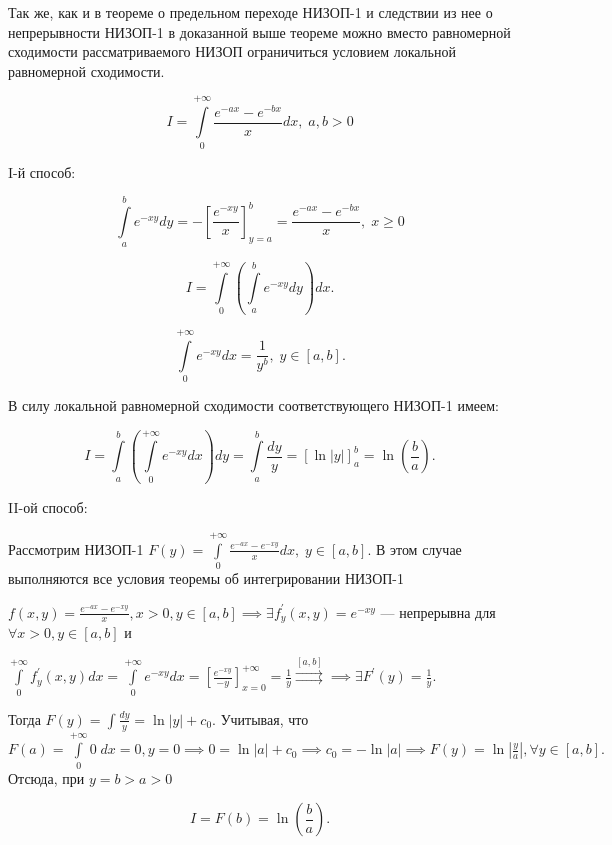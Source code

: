 \documentclass[../../main.tex]{subfiles}
\begin{document}
\begin{rem}
	Так же, как и в теореме о предельном переходе НИЗОП-1 и следствии из нее о 
	непрерывности НИЗОП-1 в доказанной выше теореме можно вместо равномерной 
	сходимости рассматриваемого НИЗОП ограничиться условием локальной равномерной 
	сходимости.
\end{rem}

\begin{exmp}
	\[
	I = \int\limits_0^{+\infty} \frac{e^{-ax} - e^{-bx}}{x} dx,\; a, b > 0
	\]
	
	I-й способ:
	
	\[
	\int\limits_a^b e^{-xy} dy = -\left[ \frac{e^{-xy}}{x} \right]^{b}_{y = a} = 
	\frac{e^{-ax} - e^{-bx}}{x}, \; x \geq 0
	\]
	
	\[
	I = \int\limits_0^{+\infty} \left( \int\limits_a^b e^{-xy} dy \right) dx.
	\]
	
	\[
	\int\limits_0^{+\infty} e^{-xy} dx = \frac{1}{y^b}, \; y \in [a, b].
	\]
	
	 В силу локальной равномерной сходимости соответствующего НИЗОП-1 имеем:
	 
	 \[
	 I = \int\limits_a^b \left( \int\limits_0^{+\infty} e^{-xy} dx \right) dy = 
	 \int\limits_a^b \frac{dy}{y} = \left[ \ln|y| \right]^b_a = 
	 \ln\left(\frac{b}{a}\right).
	 \]
	 
	 II-ой способ:
	 
	 Рассмотрим НИЗОП-1 $\displaystyle F(y) = \int\limits_0^{+\infty} 
	 \frac{e^{-ax} - e^{-xy}}{x} dx, \; y \in [a, b].$ В этом случае выполняются 
	 все условия теоремы об интегрировании НИЗОП-1
	 
	 $\displaystyle f(x, y) = \frac{e^{-ax} - e^{-xy}}{x}, x > 0, y \in [a, b] 
	 \implies \exists f^{'}_y (x, y) = e^{-xy}$
	  --- непрерывна для 
	 $\forall x > 0, y \in [a, b]$ и 
	 
	 $\displaystyle \int\limits_0^{+\infty} f^{'}_y (x, y) dx = 
	 \int\limits^{+\infty}_0 e^{-xy} dx = \left[ \frac{e^{-xy}}{-y} 
	 \right]^{+\infty}_{x = 0} = \frac{1}{y} \overset{[a, b]}\rightrightarrows 
	 \implies \exists F^{'} (y) = \frac{1}{y}.$
	 
	 Тогда $\displaystyle F(y) = \int \frac{dy}{y} = \ln|y| + c_0$. Учитывая, что 
	 $\displaystyle F(a) = \int\limits_0^{+\infty} 0\;dx = 0, y = 0 \implies 0 = 
	 \ln|a| + c_0 \implies c_0 = -\ln|a| \implies F(y) = \ln\left| \frac{y}{a} 
	 \right|, \forall y \in [a, b].$ Отсюда, при $y = b > a > 0$
	 
	 \[
	 I = F(b) = \ln\left(\frac{b}{a}\right).
	 \]
\end{exmp}
\end{document}
